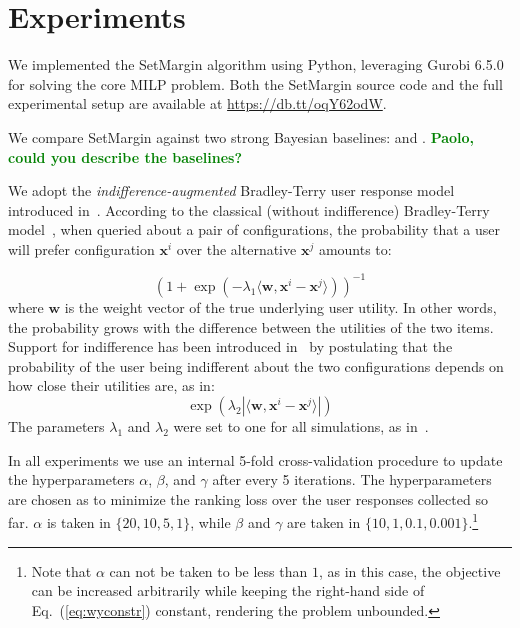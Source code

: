 \documentclass{article}
\renewcommand\[{\begin{equation}}
\renewcommand\]{\end{equation}}
\newcommand{\vecvar}[1]{\ensuremath{\boldsymbol{#1}}}
\newcommand{\vw}{\vecvar{w}}
\newcommand{\vx}{\vecvar{x}}
\newcommand{\stefano}[1]{{\bf \textcolor{green}{{\fbox{Stefano:} #1}}}}
\begin{document}
\section{Experiments}
\label{sec:experiments}

We implemented the {\sc SetMargin} algorithm using Python, leveraging Gurobi
6.5.0 for solving the core MILP problem. Both the {\sc SetMargin} source code
and the full experimental setup are available at \url{https://db.tt/oqY62odW}.

We compare {\sc SetMargin} against two strong Bayesian baselines:
\cite{guo2010real} and \cite{viappiani2010optimal}.
\stefano{Paolo, could you describe the baselines?}

We adopt the {\em indifference-augmented} Bradley-Terry user response
model introduced in~\cite{guo2010real}. According to the classical
(without indifference) Bradley-Terry model~\cite{BraTer52}, when queried about a pair
of configurations, the probability that a user will prefer
configuration $\vx^i$ over the alternative $\vx^j$ amounts to:

%
$$ (1 + \exp(-\lambda_1 \langle\vw,\vx^i - \vx^j\rangle))^{-1} $$
%
where $\vw$ is the weight vector of the true underlying user utility.
In other words, the probability grows with the difference between the
utilities of the two items. Support for indifference has been
introduced in~\cite{guo2010real} by postulating that the probability
of the user being indifferent about the two configurations depends on
how close their utilities are, as in:
%
$$ \exp(\lambda_2 |\langle\vw,\vx^i - \vx^j\rangle|) $$
%
The parameters $\lambda_1$ and $\lambda_2$ were set to one for all
simulations, as in~\cite{guo2010real}.

In all experiments we use an internal 5-fold cross-validation procedure to
update the hyperparameters $\alpha$, $\beta$, and $\gamma$ after every 5
iterations. The hyperparameters are chosen as to minimize the ranking loss over
the user responses collected so far. $\alpha$ is taken in $\{20, 10, 5, 1\}$,
while $\beta$ and $\gamma$ are taken in $\{10, 1, 0.1, 0.001\}$.\footnote{Note
that $\alpha$ can not be taken to be less than $1$, as in this case, the
objective can be increased arbitrarily while keeping the right-hand side of
Eq.~(\ref{eq:wyconstr}) constant, rendering the problem unbounded.}
\end{document}
